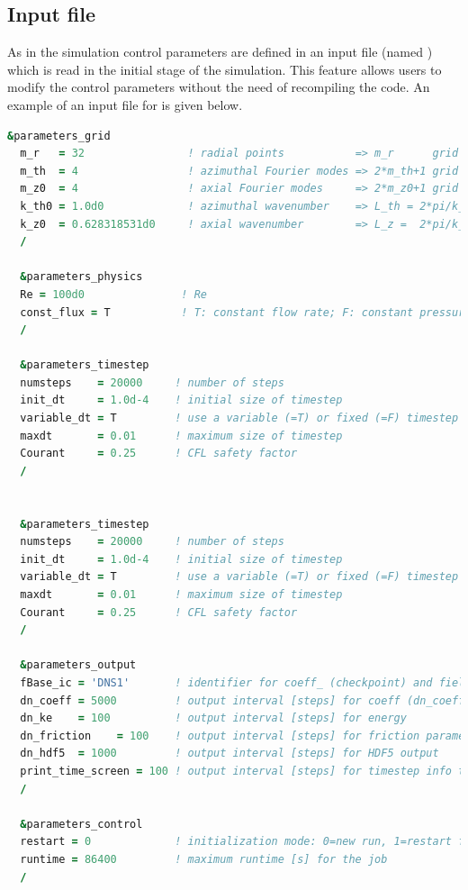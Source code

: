 \documentclass[a4paper, 11pt, DIV=11]{scrartcl}
\begin{document}
\subsection{Input file}
\label{subsec:input_nspipe}

As in \nsc the simulation control parameters are defined in an
input file (named ) which is
read in the initial stage of the simulation. This feature allows
users to modify the control parameters without the need of
recompiling the code. An example of an input file for \nsp is
given below. 
\begin{lstlisting}[language=fortran]
  &parameters_grid
  m_r   = 32                ! radial points           => m_r      grid points (radial)
  m_th  = 4                 ! azimuthal Fourier modes => 2*m_th+1 grid points (azimuthal)
  m_z0  = 4                 ! axial Fourier modes     => 2*m_z0+1 grid points (axial)
  k_th0 = 1.0d0             ! azimuthal wavenumber    => L_th = 2*pi/k_th0 azimuthal length of grid
  k_z0  = 0.628318531d0     ! axial wavenumber        => L_z =  2*pi/k_z0  axial length of grid
  /

  &parameters_physics
  Re = 100d0               ! Re
  const_flux = T           ! T: constant flow rate; F: constant pressure gradient
  /

  &parameters_timestep
  numsteps    = 20000     ! number of steps
  init_dt     = 1.0d-4    ! initial size of timestep
  variable_dt = T         ! use a variable (=T) or fixed (=F) timestep
  maxdt       = 0.01      ! maximum size of timestep
  Courant     = 0.25      ! CFL safety factor
  /


  &parameters_timestep
  numsteps    = 20000     ! number of steps
  init_dt     = 1.0d-4    ! initial size of timestep
  variable_dt = T         ! use a variable (=T) or fixed (=F) timestep
  maxdt       = 0.01      ! maximum size of timestep
  Courant     = 0.25      ! CFL safety factor
  /

  &parameters_output
  fBase_ic = 'DNS1'       ! identifier for coeff_ (checkpoint) and fields_ (hdf5) files
  dn_coeff = 5000         ! output interval [steps] for coeff (dn_coeff = -1 disables ouput)
  dn_ke    = 100          ! output interval [steps] for energy
  dn_friction    = 100    ! output interval [steps] for friction parameters
  dn_hdf5  = 1000         ! output interval [steps] for HDF5 output
  print_time_screen = 100 ! output interval [steps] for timestep info to stdout
  /

  &parameters_control
  restart = 0             ! initialization mode: 0=new run, 1=restart from checkpoint (keep time), 2=restart from checkpoint (set time=0 and create new output files)
  runtime = 86400         ! maximum runtime [s] for the job
  /
\end{lstlisting}
\end{document}
